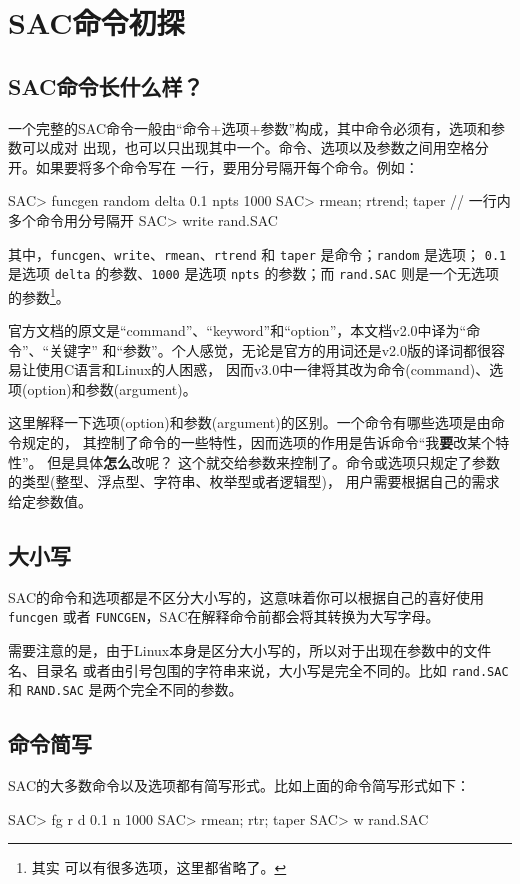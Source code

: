 \section{SAC命令初探}
\subsection{SAC命令长什么样？}
一个完整的SAC命令一般由``命令+选项+参数''构成，其中命令必须有，选项和参数可以成对
出现，也可以只出现其中一个。命令、选项以及参数之间用空格分开。如果要将多个命令写在
一行，要用分号隔开每个命令。例如：
\begin{SACCode}
SAC> funcgen random delta 0.1 npts 1000
SAC> rmean; rtrend; taper                 // 一行内多个命令用分号隔开
SAC> write rand.SAC
\end{SACCode}
其中，\texttt{funcgen}、\texttt{write}、\texttt{rmean}、\texttt{rtrend}
和 \texttt{taper} 是命令；\texttt{random} 是选项；
\texttt{0.1} 是选项 \texttt{delta} 的参数、\texttt{1000} 是选项
\texttt{npts} 的参数；而 \texttt{rand.SAC} 则是一个无选项的参数\footnote{其实
可以有很多选项，这里都省略了。}。

\begin{note}
官方文档的原文是“command”、“keyword”和“option”，本文档v2.0中译为“命令”、“关键字”
和“参数”。个人感觉，无论是官方的用词还是v2.0版的译词都很容易让使用C语言和Linux的人困惑，
因而v3.0中一律将其改为命令(command)、选项(option)和参数(argument)。

这里解释一下选项(option)和参数(argument)的区别。一个命令有哪些选项是由命令规定的，
其控制了命令的一些特性，因而选项的作用是告诉命令“我\textbf{要}改某个特性”。
但是具体\textbf{怎么}改呢？
这个就交给参数来控制了。命令或选项只规定了参数的类型(整型、浮点型、字符串、枚举型或者逻辑型)，
用户需要根据自己的需求给定参数值。
\end{note}

\subsection{大小写}
SAC的命令和选项都是不区分大小写的，这意味着你可以根据自己的喜好使用 \texttt{funcgen}
或者 \texttt{FUNCGEN}，SAC在解释命令前都会将其转换为大写字母。

需要注意的是，由于Linux本身是区分大小写的，所以对于出现在参数中的文件名、目录名
或者由引号包围的字符串来说，大小写是完全不同的。比如 \texttt{rand.SAC} 和
\texttt{RAND.SAC} 是两个完全不同的参数。

\subsection{命令简写}
SAC的大多数命令以及选项都有简写形式。比如上面的命令简写形式如下：
\begin{SACCode}
SAC> fg r d 0.1 n 1000
SAC> rmean; rtr; taper
SAC> w rand.SAC
\end{SACCode}


